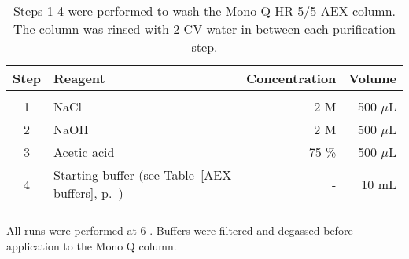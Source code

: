 \begin{table}[H]
\begin{center}
\begin{tabular}{c l r r}
\textbf{Step} & \textbf{Reagent} & \textbf{Concentration} & \textbf{Volume} \\
\hline
\\
1 & NaCl & 2 M & 500 $\mu$L \\ 
2 & NaOH & 2 M & 500 $\mu$L \\
3 & Acetic acid & 75 \% & 500 $\mu$L \\
4 & Starting buffer (see Table~\ref{AEX buffers}, p.~\pageref{AEX buffers}) & - & 10 mL \\
\\ 
\end{tabular}
\caption[Cleaning of the Mono Q\textsuperscript{\texttrademark} HR 5/5 AEX column]{Steps 1-4 were performed to wash the Mono Q\textsuperscript{\texttrademark} HR 5/5 AEX column. The column was rinsed with 2 CV water in between each purification step.}
\label{Washing}
\end{center}
\end{table}
All runs were performed at 6 \textcelsius. Buffers were filtered and degassed before application to the Mono Q\textsuperscript{\texttrademark} column.



%

